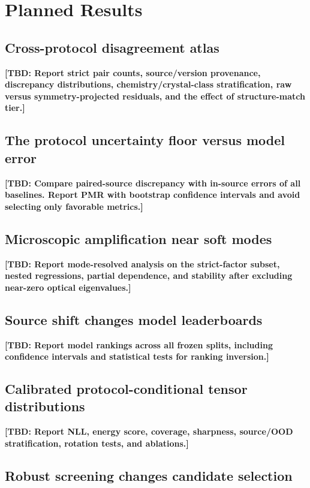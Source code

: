 \documentclass[11pt]{article}
\newcommand{\TBD}[1]{\textcolor{red!75!black}{\textbf{[TBD: #1]}}}
\begin{document}
\section{Planned Results}

\subsection{Cross-protocol disagreement atlas}

\TBD{Report strict pair counts, source/version provenance, discrepancy distributions, chemistry/crystal-class stratification, raw versus symmetry-projected residuals, and the effect of structure-match tier.}

\subsection{The protocol uncertainty floor versus model error}

\TBD{Compare paired-source discrepancy with in-source errors of all baselines. Report PMR with bootstrap confidence intervals and avoid selecting only favorable metrics.}

\subsection{Microscopic amplification near soft modes}

\TBD{Report mode-resolved analysis on the strict-factor subset, nested regressions, partial dependence, and stability after excluding near-zero optical eigenvalues.}

\subsection{Source shift changes model leaderboards}

\TBD{Report model rankings across all frozen splits, including confidence intervals and statistical tests for ranking inversion.}

\subsection{Calibrated protocol-conditional tensor distributions}

\TBD{Report NLL, energy score, coverage, sharpness, source/OOD stratification, rotation tests, and ablations.}

\subsection{Robust screening changes candidate selection}
\end{document}
